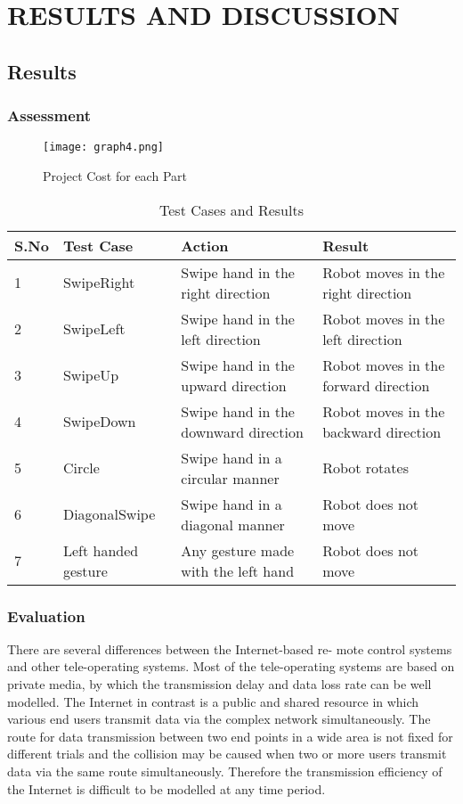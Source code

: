 
\chapter{RESULTS AND DISCUSSION} %

\section{Results}
\subsection{Assessment}


\begin{figure}[H]
  \centering
  \texttt{[image: graph4.png]}
  \caption{Project Cost for each Part}
  \label{Cost wise Estimate}	
\end{figure}

\begin{table}[H]
    \begin{tabular}{ | l | l | l | p{2cm}|}
    \hline
    S.No & Test Case & Action & Result \\ \hline
    1 & SwipeRight & Swipe hand in the right direction & Robot moves in the right direction \\ \hline
    2 & SwipeLeft &  Swipe hand in the left direction & Robot moves in the left direction \\ \hline
    3 & SwipeUp & Swipe hand in the upward direction & Robot moves in the forward direction \\ \hline
     4 & SwipeDown & Swipe hand in the downward direction & Robot moves in the backward direction \\ \hline
 5 & Circle & Swipe hand in a circular manner & Robot rotates \\ \hline
 6 & DiagonalSwipe & Swipe hand in a diagonal manner & Robot does not move \\ \hline
 7 & Left handed gesture & Any gesture made with the left hand & Robot does not move \\ \hline


    \end{tabular}
\caption{Test Cases and Results}
\label{APT}
\end{table}

\subsection{Evaluation}
There are several differences between the Internet-based re- mote control systems and other tele-operating systems. Most of the tele-operating systems are based on private media, by which the transmission delay and data loss rate can be well modelled. The Internet in contrast is a public and shared resource in which various end users transmit data via the complex network simultaneously. The route for data transmission between two end points in a wide area is not fixed for different trials and the collision may be caused when two or more users transmit data via the same route simultaneously. Therefore the transmission efficiency of the Internet is difficult to be modelled at any time period.

